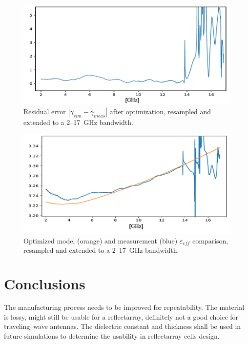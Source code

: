 \documentclass[11pt,a4paper]{article}
\begin{document}
    \begin{figure}[!t]
        \includegraphics[width=\textwidth]{residual_error}
        \caption{Residual error $|\gamma_{sim} - \gamma_{meas}|$ after optimization, resampled and extended to
        a 2--17~GHz bandwidth.}
        \label{fig:residualerr}
    \end{figure}
    \begin{figure}[!t]
        \includegraphics[width=\textwidth]{epsilon}
        \caption{Optimized model (orange) and measurement (blue) $\varepsilon_{eff}$ comparison, resampled and extended to
        a 2--17~GHz bandwidth.}
        \label{fig:epsiopti}
    \end{figure}



    \section{Conclusions}
    \label{sec:conclusion}
    The manufacturing process needs to be improved for repeatability.
    The material is lossy, might still be usable for a reflectarray, definitely not a good choice for traveling--wave antennas.
    The dielectric constant and thickness shall be used in future simulations to determine the usability in reflectarray
    cells design.
    \clearpage
    
    
\end{document}
